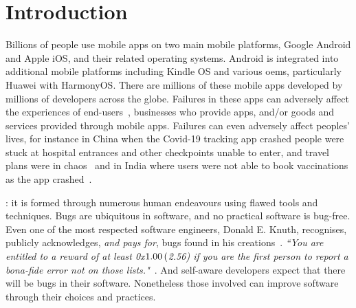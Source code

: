 \chapter{Introduction}
\label{chapter-introduction}

Billions of people use mobile apps on two main mobile platforms, Google Android and Apple iOS, and their related operating systems.  Android is integrated into additional mobile platforms including Kindle OS and various \glspl{oem}, particularly Huawei with HarmonyOS. There are millions of these mobile apps developed by millions of developers across the globe. Failures in these apps can adversely affect the experiences of end-users~, businesses who provide apps, and/or goods and services provided through mobile apps. Failures can even adversely affect peoples' lives, for instance in China when the Covid-19 tracking app crashed people were stuck at hospital entrances and other checkpoints unable to enter, and travel plans were in chaos~ and in India where users were not able to book vaccinations as the app crashed~.

: it is formed through numerous human endeavours using flawed tools and techniques.
Bugs are ubiquitous in software, and no practical software is bug-free. Even one of the most respected software engineers, Donald E. Knuth, recognises, publicly acknowledges, \emph{and pays for}, bugs found in his creations~. \emph{``You are entitled to a reward of at least 0x$1.00 \nobreak\hspace{.16667em plus .08333em} ($2.56) if you are the first person to report a \textit{bona-fide} error not on those lists."}~. And self-aware developers expect that there will be bugs in their software. Nonetheless those involved can improve software through their choices and practices.


